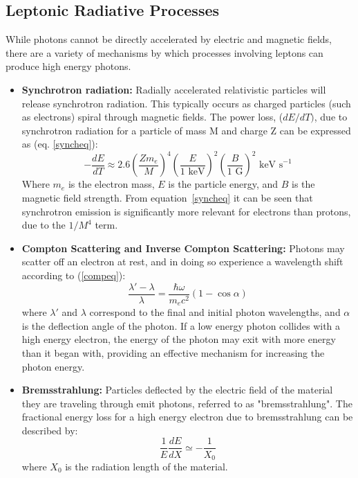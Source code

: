 \subsection{Leptonic Radiative Processes}
While photons cannot be directly accelerated by electric and magnetic fields, there are a variety of mechanisms by which processes involving leptons can produce high energy photons. 

\begin{itemize}
    \item \textbf{Synchrotron radiation:} Radially accelerated relativistic particles will release synchrotron radiation. This typically occurs as charged particles (such as electrons) spiral through magnetic fields. The power loss, ($dE/dT)$, due to synchrotron radiation for a particle of mass M and charge Z can be expressed as (eq. \ref{syncheq}):
    \begin{equation}
        -\frac{dE}{dT} \approx 2.6 (\frac{Zm_e}{M})^4(\frac{E}{\textrm{1 keV}})^2(\frac{B}{1\textrm{ G}})^2 \textrm{ keV s}^{-1}
    \label{syncheq}
    \end{equation}
    Where $m_e$ is the electron mass, $E$ is the particle energy, and $B$ is the magnetic field strength. From equation~\ref{syncheq} it can be seen that synchrotron emission is significantly more relevant for electrons than protons, due to the $1/M^4$ term.
    
    \item \textbf{Compton Scattering and Inverse Compton Scattering:} Photons may scatter off an electron at rest, and in doing so experience a wavelength shift according to (\ref{compeq}):
    \begin{equation}
        \frac{\lambda'-\lambda}{\lambda}=\frac{\hbar\omega}{m_e c^2}(1 - \cos\alpha)
    \label{compeq}
    \end{equation}
    where $\lambda'$ and $\lambda$ correspond to the final and initial photon wavelengths, and $\alpha$ is the deflection angle of the photon. If a low energy photon collides with a high energy electron, the energy of the photon may exit with more energy than it began with, providing an effective mechanism for increasing the photon energy. 

    \item \textbf{Bremsstrahlung:} Particles deflected by the electric field of the material they are traveling through emit photons, referred to as "bremsstrahlung". The fractional energy loss for a high energy electron due to bremsstrahlung can be described by:
    \begin{equation}
        \frac{1}{E}\frac{dE}{dX} \simeq -\frac{1}{X_0}
    \end{equation}
    where $X_0$ is the radiation length of the material.
\end{itemize}

